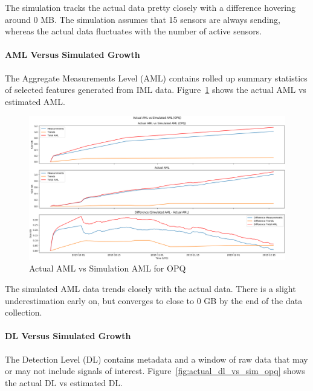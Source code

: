 The simulation tracks the actual data pretty closely with a difference hovering around 0 MB. The simulation assumes that 15 sensors are always sending, whereas the actual data fluctuates with the number of active sensors.

\paragraph{AML Versus Simulated Growth}
The Aggregate Measurements Level (AML) contains rolled up summary statistics of selected features generated from IML data. Figure~\ref{fig:actual_aml_vs_sim_opq} shows the actual AML vs estimated AML.

\begin{figure}[H]
    \centering
    \includegraphics[width=\linewidth]{figures/actual_aml_vs_sim_opq.png}
    \caption{Actual AML vs Simulation AML for OPQ}
    \label{fig:actual_aml_vs_sim_opq}
\end{figure}

The simulated AML data trends closely with the actual data. There is a slight underestimation early on, but converges to close to 0 GB by the end of the data collection.

\paragraph{DL Versus Simulated Growth}
The Detection Level (DL) contains metadata and a window of raw data that may or may not include signals of interest. Figure~\ref{fig:actual_dl_vs_sim_opq} shows the actual DL vs estimated DL.

